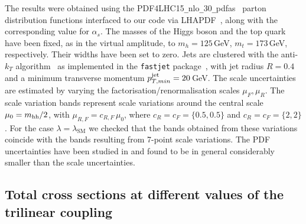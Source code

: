 
The results were obtained using the
PDF4LHC15{\tt\_}nlo{\tt\_}30{\tt\_}pdfas~\cite{Butterworth:2015oua,CT14,MMHT14,NNPDF}
parton distribution functions interfaced to our code via
LHAPDF~\cite{Buckley:2014ana}, along with the corresponding value for
$\alpha_s$.  The masses of the Higgs boson and the top quark have been
fixed, as in the virtual amplitude, to $m_h=125$\,GeV, $m_t=173$\,GeV,
respectively. Their widths have been set to zero.   
Jets are clustered with the
anti-$k_T$ algorithm~\cite{Cacciari:2008gp} as implemented in the
{\tt fastjet} package~\cite{Cacciari:2005hq, Cacciari:2011ma}, with jet
radius $R=0.4$ and a minimum transverse momentum 
$p_{T,min}^{\rm{jet}}=20$\,GeV.  The scale uncertainties are
estimated by varying the factorisation/renormalisation scales
$\mu_{F}, \mu_{R}$. The scale variation bands 
represent scale variations around the central scale $\mu_0 =m_{\mathrm{hh}}/2$, with
$\mu_{R,F}=c_{R,F}\,\mu_0$, where $c_R=c_F= \{0.5,0.5\}$ and $c_R=c_F= \{2,2\}$.
For the case $\lambda=\lambda_{\mathrm{SM}}$ we checked that the bands
obtained from these variations coincide with the bands resulting from
7-point scale variations. The PDF uncertainties have been studied in
\cite{deFlorian:2016spz} and found to be in general considerably smaller than the scale uncertainties.

\subsection{Total cross sections at different values of the trilinear coupling}


